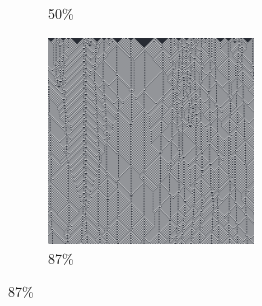 \documentclass[12pt, fleqn]{report}                             %
\theoremstyle{break}                                            %
\begin{document}
\begin{figure}[ht!]
\begin{subfigure}[b]{0.4\linewidth}
          \caption{50\%}
        \end{subfigure}
        \begin{subfigure}[b]{0.4\linewidth}
          \includegraphics[width=0.6\textwidth]{Images/54/d.png}
          \caption{87\%}
        \end{subfigure}
      \end{figure}
\end{document}
